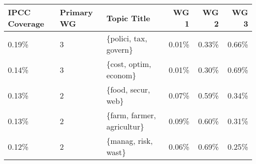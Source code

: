 \begin{tabular}{p{1.4cm} p{1cm} l r r r}
\toprule
 IPCC Coverage &  Primary WG &                 Topic Title &  WG 1 &  WG 2 &  WG 3 \\
\midrule
         0.19\% &           3 &       \{polici, tax, govern\} & 0.01\% & 0.33\% & 0.66\% \\
         0.14\% &           3 &       \{cost, optim, econom\} & 0.01\% & 0.30\% & 0.69\% \\
         0.13\% &           2 &          \{food, secur, web\} & 0.07\% & 0.59\% & 0.34\% \\
         0.13\% &           2 &  \{farm, farmer, agricultur\} & 0.09\% & 0.60\% & 0.31\% \\
         0.12\% &           2 &         \{manag, risk, wast\} & 0.06\% & 0.69\% & 0.25\% \\
\bottomrule
\end{tabular}
